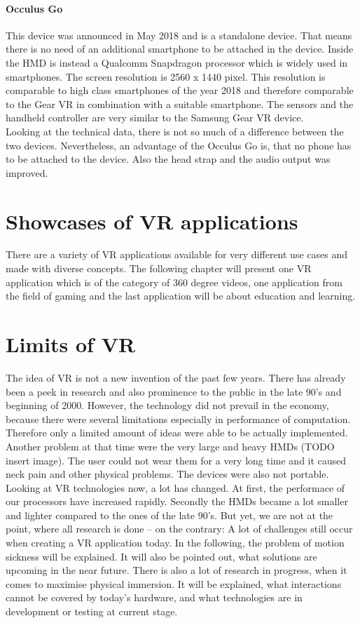 \paragraph{Occulus Go}
This device was announced in May 2018 and is a standalone device. That means there is no need of an additional smartphone to be attached in the device.
Inside the HMD is instead a Qualcomm Snapdragon processor which is widely used in smartphones. The screen resolution is  2560 x 1440 pixel. This resolution is comparable to high class smartphones of the year 2018 and therefore comparable to the Gear VR in combination with a suitable smartphone. The sensors and the handheld controller are very similar to the Samsung Gear VR device.\\
Looking at the technical data, there is not so much of a difference between the two devices. Nevertheless, an advantage of the Occulus Go is, that no phone has to be attached to the device. Also the head strap and the audio output was improved.\cite{https://www.theverge.com/2018/5/1/17306458}
\section{Showcases of VR applications}
There are a variety of VR applications available for very different use cases and made with diverse concepts. The following chapter will present one VR application which is of the category of 360 degree videos, one application from the field of gaming and the last application will be about education and learning.
\section{Limits of VR} \label{limits}
The idea of VR is not a new invention of the past few years. There has already been a peek in research and also prominence to the public in the late 90's and beginning of 2000. However, the technology did not prevail in the economy, because there were several limitations especially in performance of computation. Therefore only a limited amount of ideas were able to be actually implemented. Another problem at that time were the very large and heavy HMDs (TODO insert image). The user could not wear them for a very long time and it caused neck pain and other physical problems. The devices were also not portable. \cite{Jerald.2016}\\
Looking at VR technologies now, a lot has changed. At first, the performace of our processors have increased rapidly. Secondly the HMDs became a lot smaller and lighter compared to the ones of the late 90's. But yet, we are not at the point, where all research is done -- on the contrary: A lot of challenges still occur when creating a VR application today. In the following, the problem of motion sickness will be explained. It will also be pointed out, what solutions are upcoming in the near future. There is also a lot of research in progress, when it comes to maximise physical immersion. It will be explained, what interactions cannot be covered by today's hardware, and what technologies are in development or testing at current stage.
